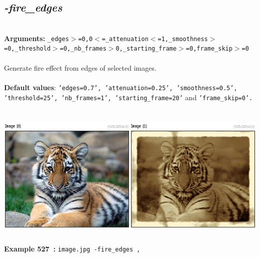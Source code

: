 \documentclass[a4paper,11pt,twoside]{book}
\begin{document}
\subsection{\emph{-fire\_edges} }\vspace*{-0.5em}
~\\\textbf{Arguments: } 
{\small \texttt{\_edges$>$=0,0$<$=\_attenuation$<$=1,\_smoothness$>$=0,\_threshold$>$=0,\_nb\_frames$>$0,\_starting\_frame$>$=0,frame\_skip$>$=0}}\\~\\
Generate fire effect from edges of selected images.
~\\~\\\textbf{Default values}: {\small \texttt{'edges=0.7', 'attenuation=0.25', 'smoothness=0.5', 'threshold=25', 'nb\_frames=1', 'starting\_frame=20'} and \texttt{'frame\_skip=0'.}}
\begin{center}\includegraphics[keepaspectratio=true,height=7cm,width=\textwidth]{img/gmic_def527.jpg}\\
{\footnotesize \textbf{Example 527~:} \texttt{image.jpg -fire\_edges ,}}
\end{center}
\end{document}
